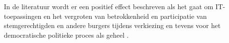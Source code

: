 In de literatuur wordt er een positief effect beschreven als het gaat om IT-toepassingen en het vergroten van betrokkenheid en participatie van stemgerechtigden en andere burgers tijdens verkiezing en tevens voor het democratische politieke proces als geheel \citep{drezner2008power,doostdar2004vulgar,gimmler2001deliberative}. 










\iffalse
Deze sectie bestaat uit een aantal "blokken", waarin je per blok de relevante literatuur beschrijft. 

Neem alleen literatuur op die van belang is voor jouw onderzoeksvraag en deelvragen.

Typisch heb je 1 blok voor je hoofdvraag en per deelvraag \textbf{RQi} een blok. 


\subsection{RQ1}

\subsection{RQ2}
\fi